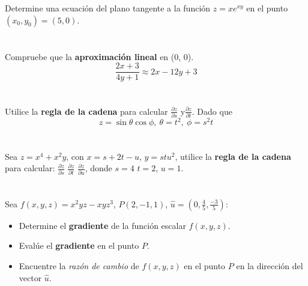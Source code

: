 \documentclass[12pt]{article}
\begin{document}
Determine una ecuación del plano tangente a la función $z = xe^{xy}$ en el punto $(x_0, y_0) = (5, 0)$.

\section{}

Compruebe que la \textbf{aproximación lineal} en (0, 0).
$$\frac{2x+3}{4y +1} \approx 2x - 12y + 3$$

\section{}

Utilice la \textbf{regla de la cadena} para calcular $\frac{\partial z}{\partial s}$ y$\frac{\partial z}{\partial t}$. Dado que
$$z = \sin{\theta}\cos{\phi}, ~ \theta = t^2, ~ \phi = s^2t$$

\section{}

Sea $z = x^4 + x^2y$, con $x = s + 2t − u$, $y = stu^2$, utilice la \textbf{regla de la cadena} para calcular: $\frac{\partial z}{\partial s}$ $\frac{\partial z}{\partial t}$ $\frac{\partial z}{\partial u}$, donde $s=4$ $t=2$, $u=1$.

\section{}

Sea $f(x, y, z) = x^2yz - xyz^3$, $P(2, -1, 1)$, $\hat{u} = \left (0,\frac{4}{5},\frac{-3}{5} \right)$:

\begin{itemize}[format=\textbf]
  
\item Determine el \textbf{gradiente} de la función escalar $f(x, y, z)$.

\item Evalúe el \textbf{gradiente} en el punto $P$.

\item Encuentre la \textit{razón de cambio} de $f(x, y, z)$ en el punto $P$ en la dirección del vector $\hat{u}$.
\end{itemize}
\end{document}
